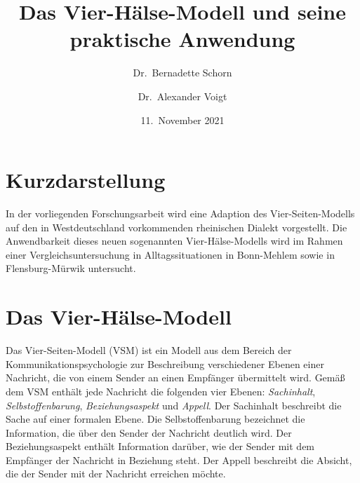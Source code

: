 \documentclass[11pt,DIV16,twocolumn]{scrartcl}
\title{Das Vier-Hälse-Modell und seine praktische Anwendung}
\author{Dr.~Bernadette Schorn}
\author{Dr.~Alexander Voigt}
\affil{Institut f\"{u}r Angewandte Philologie, Rheinische Universit\"{a}t Flensburg}
\date{11.~November 2021}
\begin{document}
\maketitle

\section*{Kurzdarstellung}

In der vorliegenden Forschungsarbeit wird eine Adaption des
Vier-Seiten-Modells auf den in Westdeutschland vorkommenden
rheinischen Dialekt vorgestellt.  Die Anwendbarkeit dieses neuen
sogenannten Vier-Hälse-Modells wird im Rahmen einer
Vergleichsuntersuchung in Alltagssituationen in Bonn-Mehlem sowie in
Flensburg-Mürwik untersucht.

\section{Das Vier-Hälse-Modell}

Das Vier-Seiten-Modell (VSM) \cite{VSM} ist ein Modell aus dem Bereich
der Kommunikationspsychologie zur Beschreibung verschiedener Ebenen
einer Nachricht, die von einem Sender an einen Empfänger übermittelt
wird.  Gemäß dem VSM enthält jede Nachricht die folgenden vier Ebenen:
\textit{Sachinhalt}, \textit{Selbstoffenbarung},
\textit{Beziehungsaspekt} und \textit{Appell}.
%
Der Sachinhalt beschreibt die Sache auf einer formalen Ebene.  Die
Selbstoffenbarung bezeichnet die Information, die über den Sender der
Nachricht deutlich wird.  Der Beziehungsaspekt enthält Information
darüber, wie der Sender mit dem Empfänger der Nachricht in Beziehung
steht.  Der Appell beschreibt die Absicht, die der Sender mit der
Nachricht erreichen möchte.
\end{document}

